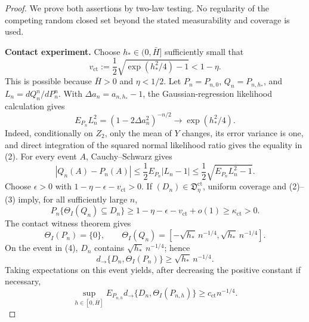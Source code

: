 \documentclass{article}
\begin{document}
\begin{proof}
We prove both assertions by two-law testing. No regularity of the competing random closed set beyond the stated measurability and coverage is used.

\textbf{Contact experiment.} Choose \(h_*\in(0,\bar H]\) sufficiently small that
\[
 v_{\mathrm{ct}}:=\frac12\sqrt{\exp(h_*^2/4)-1}<1-\eta. \tag{1}
\]
This is possible because \(\bar H>0\) and \(\eta<1/2\). Let \(P_n=P_{n,0}\), \(Q_n=P_{n,h_*}\), and \(L_n=dQ_n^n/dP_n^n\). With \(\Delta a_n=a_{n,h_*}-1\), the Gaussian-regression likelihood calculation gives
\[
 E_{P_n}L_n^2=(1-2\Delta a_n^2)^{-n/2}
 \longrightarrow\exp(h_*^2/4). \tag{2}
\]
Indeed, conditionally on \(Z_2\), only the mean of \(Y\) changes, its error variance is one, and direct integration of the squared normal likelihood ratio gives the equality in (2). For every event \(A\), Cauchy--Schwarz gives
\[
 |Q_n(A)-P_n(A)|
 \leq\frac12E_{P_n}|L_n-1|
 \leq\frac12\sqrt{E_{P_n}L_n^2-1}. \tag{3}
\]
Choose \(\epsilon>0\) with \(1-\eta-\epsilon-v_{\mathrm{ct}}>0\). If \((D_n)\in\mathfrak D_\eta^{\mathrm{ct}}\), uniform coverage and (2)--(3) imply, for all sufficiently large \(n\),
\[
 P_n\{\Theta_I(Q_n)\subseteq D_n\}
 \geq1-\eta-\epsilon-v_{\mathrm{ct}}+o(1)
 \geq\kappa_{\mathrm{ct}}>0. \tag{4}
\]
The contact witness theorem gives
\[
 \Theta_I(P_n)=\{0\},
 \qquad
 \Theta_I(Q_n)=[-\sqrt{h_*}\,n^{-1/4},
 \sqrt{h_*}\,n^{-1/4}]. \tag{5}
\]
On the event in (4), \(D_n\) contains \(\sqrt{h_*}\,n^{-1/4}\); hence
\[
 d_{\to}\{D_n,\Theta_I(P_n)\}
 \geq\sqrt{h_*}\,n^{-1/4}. \tag{6}
\]
Taking expectations on this event yields, after decreasing the positive constant if necessary,
\[
 \sup_{h\in[0,\bar H]}E_{P_{n,h}}
 d_{\to}\{D_n,\Theta_I(P_{n,h})\}
 \geq c_{\mathrm{ct}}n^{-1/4}. \tag{7}
\]


\end{proof}
\end{document}
